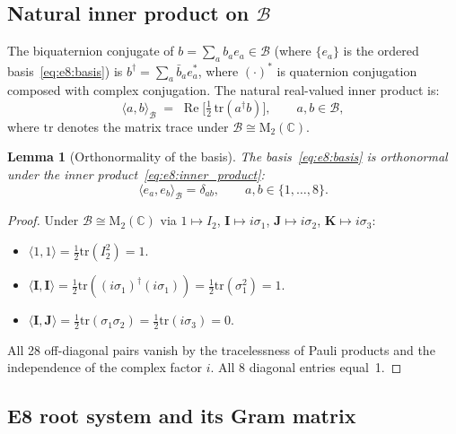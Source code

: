 \documentclass[12pt,a4paper]{article}
\newtheorem{lemma}[theorem]{Lemma}
\theoremstyle{definition}
\theoremstyle{remark}
\begin{document}
\subsection{Natural inner product on $\mathcal{B}$}

The biquaternion conjugate of $b = \sum_a b_a e_a \in \mathcal{B}$ (where $\{e_a\}$
is the ordered basis~\eqref{eq:e8:basis}) is $b^\dagger = \sum_a \bar{b}_a e_a^*$,
where $(\cdot)^*$ is quaternion conjugation composed with complex conjugation.
The natural real-valued inner product is:
\begin{equation}
  \langle a, b \rangle_{\mathcal{B}}
  \;=\; \operatorname{Re}\!\bigl[\tfrac{1}{2}\,\mathrm{tr}(a^\dagger b)\bigr],
  \qquad a, b \in \mathcal{B},
  \label{eq:e8:inner_product}
\end{equation}
where $\mathrm{tr}$ denotes the matrix trace under $\mathcal{B}\cong\mathrm{M}_2(\mathbb{C})$.

\begin{lemma}[Orthonormality of the basis]
\label{lem:e8:ortho}
The basis~\eqref{eq:e8:basis} is orthonormal under the inner product~\eqref{eq:e8:inner_product}:
\begin{equation}
  \langle e_a, e_b \rangle_{\mathcal{B}} = \delta_{ab},
  \qquad a, b \in \{1,\ldots,8\}.
  \label{eq:e8:ortho}
\end{equation}
\end{lemma}

\begin{proof}
Under $\mathcal{B}\cong\mathrm{M}_2(\mathbb{C})$ via $1\mapsto I_2$,
$\mathbf{I}\mapsto i\sigma_1$, $\mathbf{J}\mapsto i\sigma_2$, $\mathbf{K}\mapsto i\sigma_3$:
\begin{itemize}
  \item $\langle 1, 1\rangle = \tfrac{1}{2}\mathrm{tr}(I_2^2) = 1$.
  \item $\langle \mathbf{I}, \mathbf{I}\rangle = \tfrac{1}{2}\mathrm{tr}((i\sigma_1)^\dagger(i\sigma_1))
        = \tfrac{1}{2}\mathrm{tr}(\sigma_1^2) = 1$.
  \item $\langle \mathbf{I}, \mathbf{J}\rangle = \tfrac{1}{2}\mathrm{tr}(\sigma_1\sigma_2)
        = \tfrac{1}{2}\mathrm{tr}(i\sigma_3) = 0$.
\end{itemize}
All 28 off-diagonal pairs vanish by the tracelessness of Pauli products and the
independence of the complex factor $i$.  All 8 diagonal entries equal~1.
\end{proof}

\subsection{E8 root system and its Gram matrix}
\end{document}

